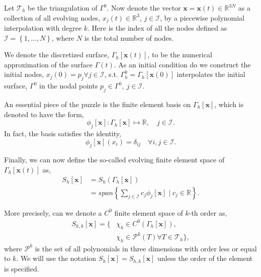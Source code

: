 Let $\mathcal{T}_{h}  $ be the triangulation of $\Gamma ^{0}$. Now denote the vector $ \mathbf{x} = \mathbf{x} \left( t \right)  \in \mathbb{R} ^{3N}$ as a collection of all evolving nodes, $x_{j}\left( t \right)  \in  \mathbb{R} ^3$, $j \in  \mathcal{I} $, by a piecewise polynomial interpolation
with degree $k$. Here is the index of all the nodes defined as $\mathcal{I} =\left\{ 1, \ldots, N \right\}  $, where $N$ is the total number of nodes.

We denote the discretized surface, $\Gamma _{h} \left[ \mathbf{x}\left( t \right)  \right] $, to be the numerical approximation of the surface $\Gamma \left( t \right) $. As an initial condition do we construct the initial nodes, $
 x_{j}( 0 )  = p_{j} \forall j \in  \mathcal{I}  $, s.t.
 $\Gamma _{h}^{0  } = \Gamma _{h} \left[ \mathbf{x}\left( 0 \right)   \right] $ interpolates the initial surface, $\Gamma ^{0}$ in the nodal points $p_{j} \in \Gamma ^{0}, \  j \in  \mathcal{I} $.

An essential piece of the puzzle is the finite element basis on $\Gamma _{h}\left[ \mathbf{x} \right] $, which is denoted to have the form,
\[
 \phi_{j} \left[ \mathbf{x} \right]: \Gamma_{h}\left[ \mathbf{x} \right] \mapsto \mathbb{R} , \quad   j \in  \mathcal{I} .
\]
In fact, the basis satisfies the identity,
\[
\phi _{j} \left[ \mathbf{x} \right] \left( x_{i} \right)  = \delta _{ij} \quad \forall i,j \in  \mathcal{I} .
\]

Finally, we can now define the so-called evolving finite element space of $\Gamma _{h}\left[ \mathbf{x}\left( t \right)  \right] $ as,
\[
    \begin{split}
S_{h}\left[ \mathbf{x} \right]   & = S_{h}\left( \Gamma _{h}\left[ \mathbf{x} \right]  \right) \\
 & = span\left\{ \sum_{j \in  \mathcal{I}  }^{}  c_{j} \phi _{j}\left[ \mathbf{x} \right]  \mid  c_{j} \in \mathbb{R}   \right\}.
    \end{split}
\]

More precisely, can we denote a $C^{0}$ finite element space of $k$-th order as,
\begin{equation*}
    \begin{split}
S_{h,k}\left[ \mathbf{x} \right]   =   \{ & \chi  _{h} \in C^{0}\left( \Gamma _{h}\left[ \mathbf{x} \right]  \right),  \\
&\chi _{h} \in \mathcal{P}^{k }\left( T \right) \forall T \in \mathcal{T}_{h}           \},
    \end{split}
\end{equation*}
where $\mathcal{P}^{k} $ is the set of all polynomials in three dimensions with order less or equal to $k$. We will use the notation $S_{h}\left[ \mathbf{x} \right] = S_{h,k}\left[ \mathbf{x} \right] $ unless the order of the element is specified.



